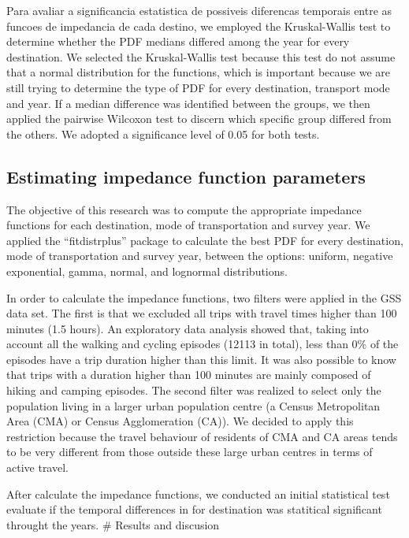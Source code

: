 \documentclass[preprint, 3p,
authoryear]{elsarticle} %
\begin{document}
Para avaliar a significancia estatistica de possiveis diferencas
temporais entre as funcoes de impedancia de cada destino, we employed
the Kruskal-Wallis test to determine whether the PDF medians differed
among the year for every destination. We selected the Kruskal-Wallis
test because this test do not assume that a normal distribution for the
functions, which is important because we are still trying to determine
the type of PDF for every destination, transport mode and year. If a
median difference was identified between the groups, we then applied the
pairwise Wilcoxon test to discern which specific group differed from the
others. We adopted a significance level of 0.05 for both tests.

\hypertarget{estimating-impedance-function-parameters}{%
\subsection{Estimating impedance function
parameters}\label{estimating-impedance-function-parameters}}

The objective of this research was to compute the appropriate impedance
functions for each destination, mode of transportation and survey year.
We applied the ``fitdistrplus'' package to calculate the best PDF for
every destination, mode of transportation and survey year, between the
options: uniform, negative exponential, gamma, normal, and lognormal
distributions.

In order to calculate the impedance functions, two filters were applied
in the GSS data set. The first is that we excluded all trips with travel
times higher than 100 minutes (1.5 hours). An exploratory data analysis
showed that, taking into account all the walking and cycling episodes
(12113 in total), less than 0\% of the episodes have a trip duration
higher than this limit. It was also possible to know that trips with a
duration higher than 100 minutes are mainly composed of hiking and
camping episodes. The second filter was realized to select only the
population living in a larger urban population centre (a Census
Metropolitan Area (CMA) or Census Agglomeration (CA)). We decided to
apply this restriction because the travel behaviour of residents of CMA
and CA areas tends to be very different from those outside these large
urban centres in terms of active travel.

After calculate the impedance functions, we conducted an initial
statistical test evaluate if the temporal differences in for destination
was statitical significant throught the years. \# Results and discusion
\end{document}
